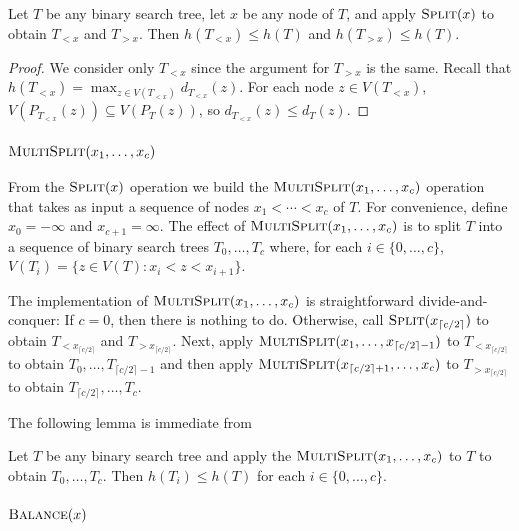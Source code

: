 \documentclass[kpfonts]{patmorin}
\begin{document}
\begin{lem}
  Let $T$ be any binary search tree, let $x$ be any node of $T$, and apply $\textsc{Split}(x)$ to obtain $T_{<x}$ and $T_{>x}$.  
  Then $h(T_{<x})\le h(T)$ and $h(T_{>x})\le h(T)$.
\end{lem}

\begin{proof}
  We consider only $T_{<x}$ since the argument for $T_{>x}$ is the same.
  Recall that $h(T_{<x})=\max_{z\in V(T_{<x})} d_{T_{<x}}(z)$.  For each node $z\in V(T_{<x})$, $V(P_{T_{<x}}(z))\subseteq V(P_T(z))$, so $d_{T_{<x}}(z)\le d_T(z)$.
\end{proof}

\subsubsection{$\textsc{MultiSplit}(x_1,\ldots,x_c)$}

From the $\textsc{Split}(x)$ operation we build the $\textsc{MultiSplit}(x_1,\ldots,x_c)$ operation that takes as input a sequence of nodes $x_1<\cdots<x_c$ of $T$.  For convenience, define $x_0=-\infty$ and $x_{c+1}=\infty$.  The effect of $\textsc{MultiSplit}(x_1,\ldots,x_c)$ is to split $T$ into a sequence of binary search trees $T_0,\ldots,T_{c}$ where, for each $i\in\{0,\ldots,c\}$, $V(T_i)=\{z\in V(T): x_i< z<x_{i+1}\}$.

The implementation of $\textsc{MultiSplit}(x_1,\ldots,x_c)$ is straightforward divide-and-conquer:  If $c=0$, then there is nothing to do.  Otherwise, call $\textsc{Split}(x_{\lceil c/2\rceil})$ to obtain $T_{<x_{\lceil c/2\rceil}}$ and $T_{>x_{\lceil c/2\rceil}}$.  Next, apply $\textsc{MultiSplit}(x_1,\ldots,x_{\lceil c/2\rceil-1})$ to $T_{<x_{\lceil c/2\rceil}}$ to obtain $T_0,\ldots,T_{\lceil c/2\rceil-1}$ and then apply $\textsc{MultiSplit}(x_{\lceil c/2\rceil+1},\ldots,x_c)$ to $T_{>x_{\lceil c/2\rceil}}$ to obtain $T_{\lceil c/2\rceil},\ldots,T_c$.

The following lemma is immediate from  
\begin{lem}
  Let $T$ be any binary search tree and apply the $\textsc{MultiSplit}(x_1,\ldots,x_c)$ to $T$ to obtain $T_0,\ldots,T_c$.  Then $h(T_i)\le h(T)$ for each $i\in\{0,\ldots,c\}$.
\end{lem}

\subsubsection{$\textsc{Balance}(x)$}
\end{document}
